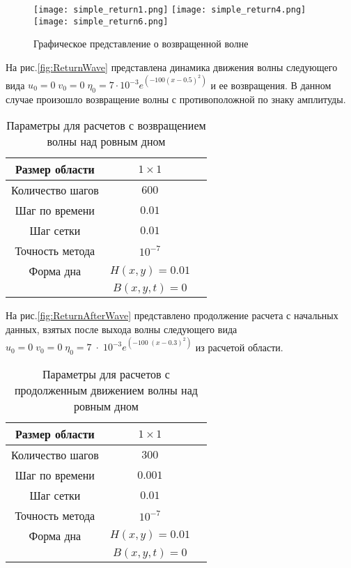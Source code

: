 \begin{figure}[H]
    \centering
    \texttt{[image: simple\_return1.png]}
    \texttt{[image: simple\_return4.png]}
    \texttt{[image: simple\_return6.png]}
    \caption{Графическое представление о возвращенной волне}
    \label{fig:ReturnWaveSmall}
\end{figure}

На рис.\ref{fig:ReturnWave} представлена динамика движения волны следующего вида $u_0=0\;v_0=0\;\eta_0=7 \cdot 10^{-3}e^{(-100 (x-0.5)^2)}$
и ее возвращения. В данном случае произошло возвращение волны с противоположной по знаку амплитуды.

\begin{table}[H]
    \label{tab:FirstResult}
    \caption{Параметры для расчетов с возвращением волны над ровным дном}
    \begin{center}
	\begin{tabular}{|c|c|c|}
	    \hline
	    Размер области & $1\times1$\\
	    \hline
	    Количество шагов & $600$\\
	    \hline
	    Шаг по времени & $0.01$\\
	    \hline
	    Шаг сетки & $0.01$\\
	    \hline
	    Точность метода & $10^{-7}$\\
	    \hline
	    Форма дна & $H(x,y)=0.01$\\
	    & $B(x,y,t)=0$\\
	    \hline
	\end{tabular}
    \end{center}
\end{table}

На рис.\ref{fig:ReturnAfterWave} представлено продолжение расчета с начальных данных, взятых после выхода волны следующего вида $u_0=0\;v_0=0\;\eta_0=7\;\cdot\;10^{-3}e^{(-100\;(x-0.3)^2)}$ из расчетой области.

\begin{table}[H]
    \label{tab:FirstResult}
    \caption{Параметры для расчетов с продолженным движением волны над ровным дном}
    \begin{center}
	\begin{tabular}{|c|c|c|}
	    \hline
	    Размер области & $1\times1$\\
	    \hline
	    Количество шагов & $300$\\
	    \hline
	    Шаг по времени & $0.001$\\
	    \hline
	    Шаг сетки & $0.01$\\
	    \hline
	    Точность метода & $10^{-7}$\\
	    \hline
	    Форма дна & $H(x,y)=0.01$\\
	    & $B(x,y,t)=0$\\
	    \hline
	\end{tabular}
    \end{center}
\end{table}

